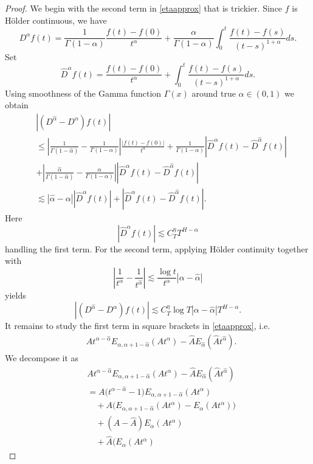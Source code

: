 \documentclass[11pt,reqno,oneside, a4paper]{amsart}
\numberwithin{equation}{section}
\theoremstyle{remark}
\begin{document}
\begin{proof}
We begin with the second term in \eqref{etaapprox} that is trickier. Since $f$ is H\"older continuous, we have 
\begin{equation*}
D^\alpha f(t) = \frac{1}{\Gamma(1-\alpha)}\frac{f(t)-f(0)}{t^\alpha} + \frac{\alpha}{\Gamma(1-\alpha)}\int_0^t \frac{f(t)-f(s)}{(t-s)^{1+\alpha}}ds.
\end{equation*}
Set 
$$
\hat{D}^\alpha f(t) = \frac{f(t)-f(0)}{t^\alpha} + \int_0^t \frac{f(t)-f(s)}{(t-s)^{1+\alpha}}ds.
$$
Using smoothness of the Gamma function $\Gamma(x)$ around true $\alpha \in (0,1)$ we obtain 
\begin{align*}
& |(D^{\hat\alpha} - D^\alpha)f(t)| \\
&\leq  \left|\frac{1}{\Gamma(1-\hat\alpha)} - \frac{1}{\Gamma(1-\alpha)}\right|\frac{|f(t)-f(0)|}{t^\alpha} + \frac{1}{\Gamma(1-\alpha)}|\hat{D}^\alpha f(t) - \hat{D}^{\hat\alpha} f(t)|\\
&+  \left|\frac{\hat\alpha}{\Gamma(1-\hat\alpha)} - \frac{\alpha}{\Gamma(1-\alpha)}\right||\hat{D}^\alpha f(t) - \hat{D}^{\hat\alpha} f(t)|\\
&\lesssim |\hat\alpha - \alpha||\hat{D}^\alpha f(t)| + |\hat{D}^\alpha f(t) - \hat{D}^{\hat\alpha} f(t)|.
\end{align*}
Here 
$$
|\hat{D}^\alpha f(t)| \lesssim C^\eta_T T^{H-\alpha}
$$
handling the first term. For the second term, applying H\"older continuity together with 
$$
\left\vert\frac{1}{t^{\alpha}} - \frac{1}{t^{\hat\alpha}}\right\vert \lesssim \frac{\log t}{t^\alpha} |\alpha - \hat\alpha|
$$
yields
$$
|(D^{\hat\alpha} - D^\alpha)f(t)| \lesssim C_T^\eta \log T |\alpha-\hat\alpha| T^{H-\alpha}.
$$
It remains to study the first term in square brackets in \eqref{etaapprox}, i.e.
\begin{align*}
& At^{\alpha-\hat\alpha}E_{\alpha,\alpha+1-\hat\alpha}(A t^\alpha) - \hat{A}E_{\hat\alpha}(\hat{A}t^{\hat\alpha}).
\end{align*}
We decompose it as
\begin{align*}
	&
	A t^{\alpha-\hat\alpha}
	E_{\alpha,\alpha+1-\hat\alpha}(At^\alpha)
	-
	\hat A
	E_{\hat\alpha}( \hat A t^{\hat\alpha} )
	\\
	&=
	A\Big(
	t^{\alpha-\hat\alpha}-1
	\Big)
	E_{\alpha,\alpha+1-\hat\alpha}(At^\alpha)
	\\
	&\quad
	+
	A\Big(
	E_{\alpha,\alpha+1-\hat\alpha}(At^\alpha)
	-
	E_\alpha(At^\alpha)
	\Big)
	\\
	&\quad
	+
	(A-\hat A)E_\alpha(At^\alpha)
	\\
	&\quad
	+
	\hat A
	\Big(
	E_\alpha(At^\alpha)

\end{align*}
\end{proof}
\end{document}

